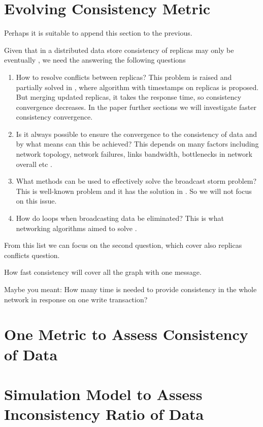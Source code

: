 \documentclass{llncs}
\begin{document}
\section{Evolving Consistency Metric}
{\color{red}
Perhaps it is suitable to append this section to the previous.%
}\par\noindent
Given that in a distributed data store consistency of replicas may only be eventually \cite[{\color{red} you need to refer to the corresponding papers}]{?}, we need the answering the following questions
\begin{enumerate}
\item
How to resolve conflicts between replicas?
This problem is raised and partially solved in \cite{bib:c_ts}, where algorithm with timestamps on replicas is proposed.
But merging updated replicas, it takes the response time, so consistency convergence decreases.
In the paper further sections we will investigate faster consistency convergence.
\item
Is it always possible to ensure the convergence to the consistency of data and by what means can this be achieved?
This depends on many factors including network topology,
network failures, links bandwidth, bottlenecks in network overall etc \cite[{\color{red} links are needed}]{?}.
\item
What methods can be used to effectively solve the broadcast storm problem?
This is well-known problem and it has the solution in \cite[{\color{red} links are needed}]{?}.
So we will not focus on this issue.
\item How do loops when broadcasting data be eliminated?
This is what networking algorithms aimed to solve \cite[{\color{red} links are needed}]{?}.
\end{enumerate}

From this list we can focus on the second question, which cover also replicas conflicts question.

How fast consistency will cover all the graph with one message.

{\color{red}%
Maybe you meant:
How many time is needed to provide consistency in the whole network in response on one write transaction?%
}
\section{One Metric to Assess Consistency of Data}
\section{Simulation Model to Assess Inconsistency Ratio of Data}
\end{document}
